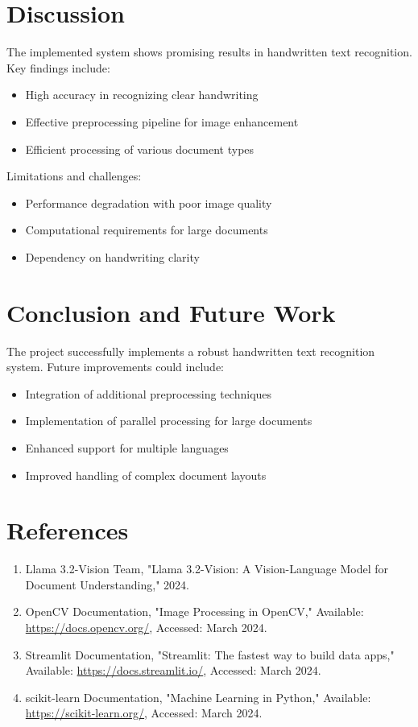 \documentclass[a4paper,12pt]{article}
\begin{document}
\section{Discussion}
The implemented system shows promising results in handwritten text recognition. Key findings include:
\begin{itemize}
    \item High accuracy in recognizing clear handwriting
    \item Effective preprocessing pipeline for image enhancement
    \item Efficient processing of various document types
\end{itemize}

Limitations and challenges:
\begin{itemize}
    \item Performance degradation with poor image quality
    \item Computational requirements for large documents
    \item Dependency on handwriting clarity
\end{itemize}

\section{Conclusion and Future Work}
The project successfully implements a robust handwritten text recognition system. Future improvements could include:
\begin{itemize}
    \item Integration of additional preprocessing techniques
    \item Implementation of parallel processing for large documents
    \item Enhanced support for multiple languages
    \item Improved handling of complex document layouts
\end{itemize}

\section{References}
\begin{enumerate}
    \item Llama 3.2-Vision Team, "Llama 3.2-Vision: A Vision-Language Model for Document Understanding," 2024.
    \item OpenCV Documentation, "Image Processing in OpenCV," Available: \url{https://docs.opencv.org/}, Accessed: March 2024.
    \item Streamlit Documentation, "Streamlit: The fastest way to build data apps," Available: \url{https://docs.streamlit.io/}, Accessed: March 2024.
    \item scikit-learn Documentation, "Machine Learning in Python," Available: \url{https://scikit-learn.org/}, Accessed: March 2024.
\end{enumerate}
\end{document}
